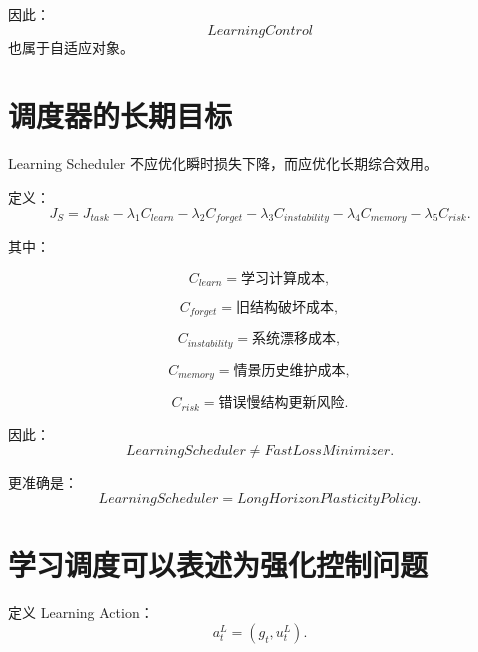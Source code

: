 因此：
\begin{equation}
\boxed{
LearningControl
}
\end{equation}
也属于自适应对象。


\section{调度器的长期目标}

Learning Scheduler 不应优化瞬时损失下降，而应优化长期综合效用。

定义：
\begin{equation}
\boxed{
J_S
=
J_{task}
-
\lambda_1 C_{learn}
-
\lambda_2 C_{forget}
-
\lambda_3 C_{instability}
-
\lambda_4 C_{memory}
-
\lambda_5 C_{risk}.
}
\end{equation}

其中：

\begin{equation}
C_{learn}
=
\text{学习计算成本},
\end{equation}

\begin{equation}
C_{forget}
=
\text{旧结构破坏成本},
\end{equation}

\begin{equation}
C_{instability}
=
\text{系统漂移成本},
\end{equation}

\begin{equation}
C_{memory}
=
\text{情景历史维护成本},
\end{equation}

\begin{equation}
C_{risk}
=
\text{错误慢结构更新风险}.
\end{equation}

因此：
\begin{equation}
\boxed{
LearningScheduler
\neq
FastLossMinimizer.
}
\end{equation}

更准确是：
\begin{equation}
\boxed{
LearningScheduler
=
LongHorizonPlasticityPolicy.
}
\end{equation}


\section{学习调度可以表述为强化控制问题}

定义 Learning Action：
\begin{equation}
a_t^L
=
(
g_t,
u_t^L
).
\end{equation}

